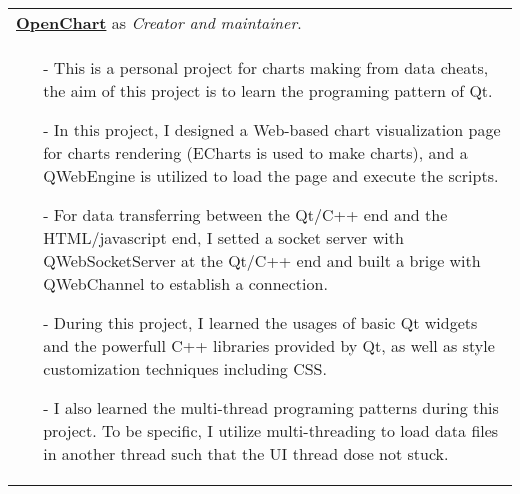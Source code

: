 \documentclass[a4paper,12pt]{article}
\newcommand{\signed}[1]{%
\unskip\nobreak\hfil\penalty50
   \hskip2em\hbox{}\nobreak\hfil#1
   \parfillskip=0pt \finalhyphendemerits=0 }
\begin{document}
\begin{tabularx}{\linewidth}{ @{}X@{} }
    \href{https://github.com/leonezz/OpenChart.git}{\textbf{OpenChart}} as \textit{Creator and maintainer}.
    \signed{Jun. 2019 - Dec. 2019} \\[3.75pt]
    \begin{minipage}[t]{\linewidth}
        \begin{itemize}[nosep,after=\strut, leftmargin=1em, itemsep=3pt]
            \item[-] This is a personal project for charts making from data cheats, the aim of this project is to learn the programing pattern of Qt.
            \item[-] In this project, I designed a Web-based chart visualization page for charts rendering (ECharts is used to make charts),
            and a QWebEngine is utilized to load the page and execute the scripts.
            \item[-] For data transferring between the Qt/C++ end and the HTML/javascript end, I setted a socket server with QWebSocketServer
            at the Qt/C++ end and built a brige with QWebChannel to establish a connection.
            \item[-] During this project, I learned the usages of basic Qt widgets and the powerfull C++ libraries provided by Qt,
            as well as style customization techniques including CSS.
            \item[-] I also learned the multi-thread programing patterns during this project. To be specific,
            I utilize multi-threading to load data files in another thread such that the UI thread dose not stuck.
        \end{itemize}
        \end{minipage}
\end{tabularx}
\end{document}
